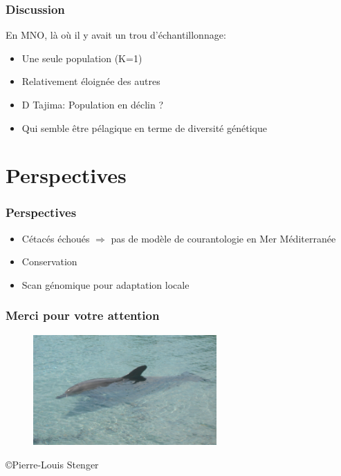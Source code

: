 \documentclass[10pt,xcolor=table]{beamer}\usepackage[]{graphicx}\usepackage[]{color}
\begin{document}
\begin{frame}
\frametitle{Discussion}
En MNO, là où il y avait un trou d'échantillonnage:
\begin{itemize}
	\item <1-> Une seule population (K=1)
	\item <2-> Relativement éloignée des autres
	\item <3-> D Tajima: Population en déclin ?
	\item <4-> Qui semble être pélagique en terme de diversité génétique \citep{lowther2014}
\end{itemize}
\end{frame}

\section{Perspectives}

\begin{frame}
\frametitle{Perspectives}
\begin{itemize}
	\item <1-> Cétacés échoués $\Rightarrow$  pas de modèle de courantologie en Mer Méditerranée \cite{peltier2012significance}
	\item <2-> Conservation
	\item <3-> Scan génomique pour adaptation locale
\end{itemize}
\end{frame}

\begin{frame}
\frametitle{Merci pour votre attention}
		\begin{figure}
			\begin{center}
			\includegraphics[width=7cm]{tursiopsAussie} 
			\end{center}
		\end{figure}
		\centering \tiny\copyright Pierre-Louis Stenger
\end{frame}

\begin{frame}[allowframebreaks]
	
	\footnotesize
\end{frame}
\end{document}
